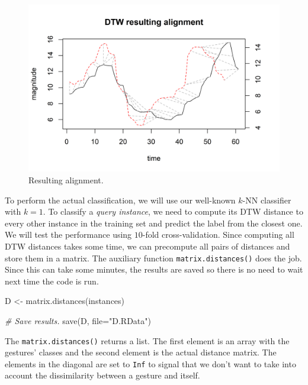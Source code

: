 \documentclass[
  11pt,
]{krantz}
\newenvironment{Shaded}{\begin{snugshade}}{\end{snugshade}}
\newcommand{\AttributeTok}[1]{\textcolor[rgb]{0.61,0.61,0.61}{#1}}
\newcommand{\CommentTok}[1]{\textcolor[rgb]{0.37,0.37,0.37}{\textit{#1}}}
\newcommand{\FunctionTok}[1]{\textcolor[rgb]{0,0,0}{#1}}
\newcommand{\NormalTok}[1]{#1}
\newcommand{\OtherTok}[1]{\textcolor[rgb]{0.37,0.37,0.37}{#1}}
\newcommand{\StringTok}[1]{\textcolor[rgb]{0.5,0.5,0.5}{#1}}
\begin{document}
\begin{figure}

{\centering \includegraphics[width=0.9\linewidth]{images/alignmentExample} 

}

\caption{Resulting alignment.}\label{fig:alignmentExample}
\end{figure}

To perform the actual classification, we will use our well-known \(k\)-NN classifier with \(k=1\). To classify a \emph{query instance}, we need to compute its DTW distance to every other instance in the training set and predict the label from the closest one. We will test the performance using \(10\)-fold cross-validation. Since computing all DTW distances takes some time, we can precompute all pairs of distances and store them in a matrix. The auxiliary function \texttt{matrix.distances()} does the job. Since this can take some minutes, the results are saved so there is no need to wait next time the code is run.

\begin{Shaded}
\begin{Highlighting}[]
\NormalTok{D }\OtherTok{\textless{}{-}} \FunctionTok{matrix.distances}\NormalTok{(instances)}

\CommentTok{\# Save results.}
\FunctionTok{save}\NormalTok{(D, }\AttributeTok{file=}\StringTok{"D.RData"}\NormalTok{)}
\end{Highlighting}
\end{Shaded}

The \texttt{matrix.distances()} returns a list. The first element is an array with the gestures' classes and the second element is the actual distance matrix. The elements in the diagonal are set to \texttt{Inf} to signal that we don't want to take into account the dissimilarity between a gesture and itself.
\end{document}
